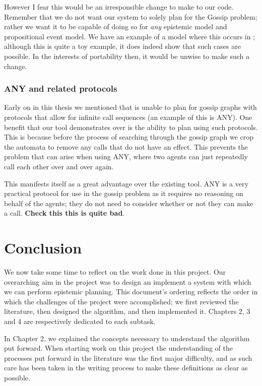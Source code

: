 \documentclass[10pt, a4paper]{report}
\begin{document}
However I fear this would be an irresponsible change to make to our code.
Remember that we do not want our system to solely plan for the Gossip problem;
rather we want it to be capable of doing so for \emph{any} epistemic model and
propositional event model. We have an example of a model where this occurs in
; although this is quite a toy example, it does indeed show
that such cases are possible. In the interests of portability then, it would be
unwise to make such a change. 

\subsection{\textsf{ANY} and related protocols}

Early on in this thesis we mentioned that \cite{GithubGossip} is unable to plan
for gossip graphs with protocols that allow for infinite call sequences (an
example of this is \textsf{ANY}). One benefit that our tool demonstrates over
\cite{GithubGossip} is the ability to plan using such protocols. This is because
before the process of searching through the gossip graph we crop the automata to
remove any calls that do not have an effect. This prevents the problem that can
arise when using \textsf{ANY}, where two agents can just repeatedly call each
other over and over again. 

This manifests itself as a great advantage over the existing tool. \textsf{ANY}
is a very practical protocol for use in the gossip problem as it requires no
reasoning on behalf of the agents; they do not need to consider whether or not
they can make a call. \textbf{Check this this is quite bad}.

\newpage

\chapter{Conclusion}

We now take some time to reflect on the work done in this project. Our
overarching aim in the project was to design an implement a system with which we
can perform epistemic planning. This document's ordering reflects the order in
which the challenges of the project were accomplished; we first reviewed the
literature, then designed the algorithm, and then implemented it. Chapters 2, 3
and 4 are respectively dedicated to each subtask.

In Chapter 2, we explained the concepts necessary to understand the algorithm
put forward. When starting work on this project the understanding of the
processes put forward in the literature was the first major difficulty, and as
such care has been taken in the writing process to make these definitions as clear
as possible. 
\end{document}
